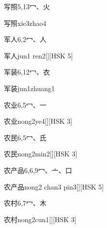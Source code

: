 \begin{entry}{写照}{5,13}{⼍、⽕}
  \begin{phonetics}{写照}{xie3zhao4}
  \end{phonetics}
\end{entry}

\begin{entry}{军人}{6,2}{⼍、⼈}
  \begin{phonetics}{军人}{jun1 ren2}[][HSK 5]
  \end{phonetics}
\end{entry}

\begin{entry}{军装}{6,12}{⼍、⾐}
  \begin{phonetics}{军装}{jun1zhuang1}
  \end{phonetics}
\end{entry}

\begin{entry}{农业}{6,5}{⼍、⼀}
  \begin{phonetics}{农业}{nong2ye4}[][HSK 3]
  \end{phonetics}
\end{entry}

\begin{entry}{农民}{6,5}{⼍、⽒}
  \begin{phonetics}{农民}{nong2min2}[][HSK 3]
  \end{phonetics}
\end{entry}

\begin{entry}{农产品}{6,6,9}{⼍、⼇、⼝}
  \begin{phonetics}{农产品}{nong2 chan3 pin3}[][HSK 5]
  \end{phonetics}
\end{entry}

\begin{entry}{农村}{6,7}{⼍、⽊}
  \begin{phonetics}{农村}{nong2cun1}[][HSK 3]
  \end{phonetics}
\end{entry}

